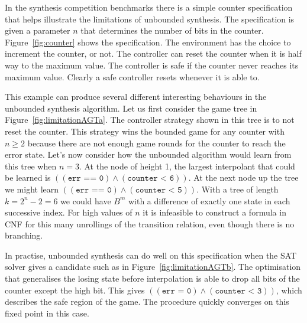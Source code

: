 In the synthesis competition benchmarks there is a simple counter specification that helps illustrate the limitations of unbounded synthesis. The specification is given a parameter $n$ that determines the number of bits in the counter. Figure~\ref{fig:counter} shows the specification. The environment has the choice to increment the counter, or not. The controller can reset the counter when it is half way to the maximum value. The controller is safe if the counter never reaches its maximum value. Clearly a safe controller resets whenever it is able to.

This example can produce several different interesting behaviours in the unbounded synthesis algorithm. Let us first consider the game tree in Figure~\ref{fig:limitationAGTa}. The controller strategy shown in this tree is to not reset the counter. This strategy wins the bounded game for any counter with $n \geq 2$ because there are not enough game rounds for the counter to reach the error state. Let's now consider how the unbounded algorithm would learn from this tree when $n = 3$. At the node of height 1, the largest interpolant that could be learned is $((\texttt{err == 0}) \land (\texttt{counter < 6}))$. At the next node up the tree we might learn $((\texttt{err == 0}) \land (\texttt{counter < 5}))$. With a tree of length $k = 2^n - 2 = 6$ we could have $B^m$ with a difference of exactly one state in each successive index. For high values of $n$ it is infeasible to construct a formula in CNF for this many unrollings of the transition relation, even though there is no branching.

In practise, unbounded synthesis can do well on this specification when the SAT solver gives a candidate such as in Figure~\ref{fig:limitationAGTb}. The optimisation that generalises the losing state before interpolation is able to drop all bits of the counter except the high bit. This gives $((\texttt{err = 0}) \land (\texttt{counter < 3}))$, which describes the safe region of the game. The procedure quickly converges on this fixed point in this case.


